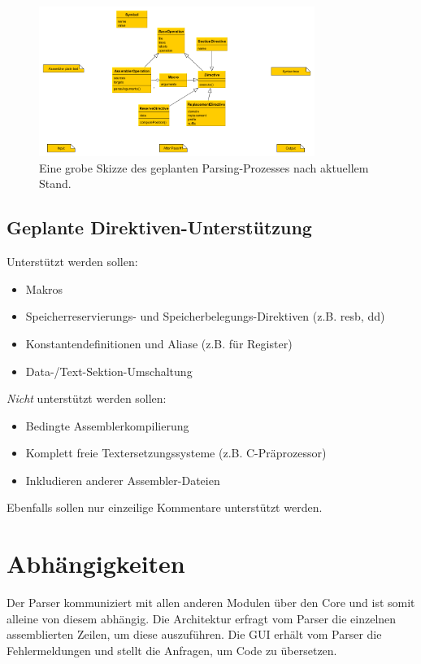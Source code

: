 \begin{figure}[h!]
  \centering
  \includegraphics[width=0.8\textwidth]{../parser/figures/process.png}
  \caption{Eine grobe Skizze des geplanten Parsing-Prozesses nach aktuellem Stand.}
\end{figure}

\subsection{Geplante Direktiven-Unterstützung} Unterstützt werden sollen:

\begin{itemize}
\item Makros
\item Speicherreservierungs- und Speicherbelegungs-Direktiven (z.B. resb, dd)
\item Konstantendefinitionen und Aliase (z.B. für Register)
\item Data-/Text-Sektion-Umschaltung
\end{itemize}

\emph{Nicht} unterstützt werden sollen:

\begin{itemize}
\item Bedingte Assemblerkompilierung
\item Komplett freie Textersetzungssysteme (z.B. C-Präprozessor)
\item Inkludieren anderer Assembler-Dateien
\end{itemize} Ebenfalls sollen nur einzeilige Kommentare unterstützt werden.

\section{Abhängigkeiten}
Der Parser kommuniziert mit allen anderen Modulen
über den Core und ist somit alleine von diesem abhängig.  Die Architektur
erfragt vom Parser die einzelnen assemblierten Zeilen, um diese auszuführen.
Die GUI erhält vom Parser die Fehlermeldungen und stellt die Anfragen, um Code
zu übersetzen.

